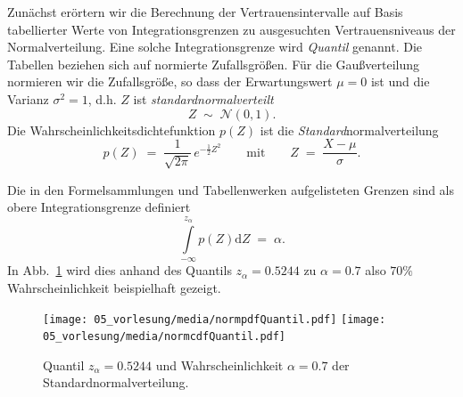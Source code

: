 Zunächst erörtern wir die Berechnung der Vertrauensintervalle auf Basis
tabellierter Werte von Integrationsgrenzen zu ausgesuchten Ver\-trauens\-niveaus
der Normalverteilung. Eine solche Integrationsgrenze wird \textsl{Quantil}
genannt. Die Tabellen beziehen sich auf normierte Zufallsgrößen.
Für die Gaußverteilung normieren wir die Zufallsgröße, so dass der
Erwartungswert $\mu = 0$ ist und die Varianz $\sigma^2 = 1$, d.h.
$Z$ ist \textsl{standardnormalverteilt}
\begin{equation}
Z \; \sim \; \mathcal{N}(0,1) .
\label{standardNormalverteilt}
\end{equation}
Die Wahrscheinlichkeitsdichtefunktion $p(Z)$ ist die \textsl{Standard}normalverteilung
\begin{equation}
p(Z) \; = \; \frac{1}{\sqrt{2 \pi}} \, e^{-\frac{1}{2} Z^2}
\qquad \textrm{mit} \qquad Z \; = \; \frac{X - \mu}{\sigma} .
\end{equation}

Die in den Formelsammlungen und Tabellenwerken aufgelisteten Grenzen sind
als obere Integrationsgrenze definiert
\begin{equation}
\int\limits_{-\infty}^{z_\alpha} p(Z) \mathrm{d} Z \; = \; \alpha .
\label{WahrscheinlichkeitQuantil}
\end{equation}
In Abb.~\ref{normVertQuantil} wird dies anhand des Quantils $z_\alpha = 0.5244$
zu $\alpha = 0.7$ also $70 \%$ Wahrscheinlichkeit beispielhaft gezeigt.

\begin{figure}
\begin{center}
\texttt{[image: 05\_vorlesung/media/normpdfQuantil.pdf]}
\hspace{5mm}
\texttt{[image: 05\_vorlesung/media/normcdfQuantil.pdf]}
\caption{\label{normVertQuantil} Quantil $z_\alpha = 0.5244$ und Wahrscheinlichkeit
$\alpha = 0.7$ der Standard\-normalverteilung.}
\end{center}
\end{figure}

